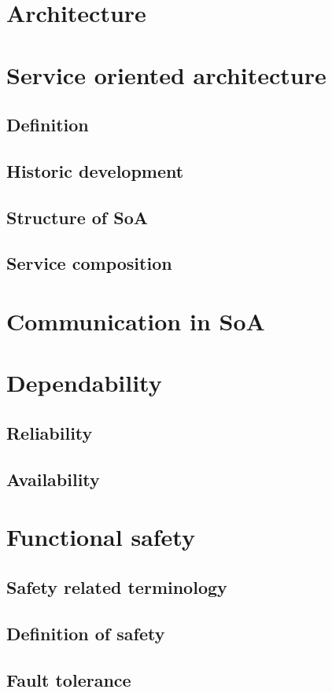 \section{Architecture}

\section{Service oriented architecture}
\subsection{Definition}
\subsection{Historic development}
\subsection{Structure of SoA}
\subsection{Service composition}

\section{Communication in SoA}

\section{Dependability}
\subsection{Reliability}
\subsection{Availability}

\section{Functional safety}
\subsection{Safety related terminology}
\subsection{Definition of safety}
\subsection{Fault tolerance}